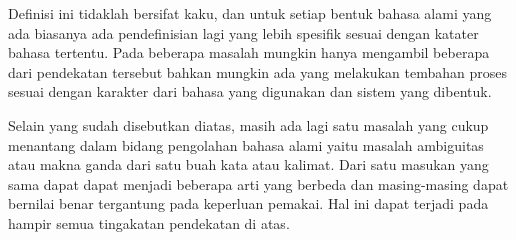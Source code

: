 Definisi ini tidaklah bersifat kaku, dan untuk setiap bentuk bahasa alami yang ada biasanya ada pendefinisian lagi yang lebih spesifik sesuai dengan katater bahasa tertentu. Pada beberapa masalah mungkin hanya mengambil beberapa dari pendekatan tersebut bahkan mungkin ada yang melakukan tembahan proses sesuai dengan karakter dari bahasa yang digunakan dan sistem yang dibentuk.

Selain yang sudah disebutkan diatas, masih ada lagi satu masalah yang cukup menantang dalam bidang pengolahan bahasa alami yaitu masalah ambiguitas atau makna ganda dari satu buah kata atau kalimat. Dari satu masukan yang sama dapat dapat menjadi beberapa arti yang berbeda dan masing-masing dapat bernilai benar tergantung pada keperluan pemakai. Hal ini dapat terjadi pada hampir semua tingakatan pendekatan di atas.